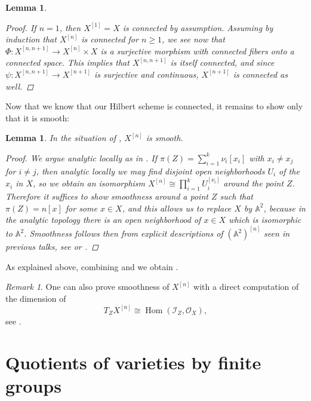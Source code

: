 \documentclass[12pt,a4paper]{amsart}
\theoremstyle{plain}
\newtheorem{lm}[thm]{Lemma}
\theoremstyle{definition}
\theoremstyle{remark}
\newtheorem{rem}[thm]{Remark}
\begin{document}
\begin{lm}
\begin{proof}
    If $n = 1$, then $X^{[1]} = X$ is connected by assumption.
    Assuming by induction that $X^{[n]}$ is connected for $n \geq 1$, we see now that $\Phi \colon X^{[n, n+1]} \to X^{[n]} \times X$ is a surjective morphism with connected fibers onto a connected space.
    This implies that $X^{[n, n+1]}$ is itself connected, and since $\psi \colon X^{[n,n+1]} \to X^{[n+1]}$ is surjective and continuous, $X^{[n+1]}$ is connected as well.
  \end{proof}
\end{lm}

Now that we know that our Hilbert scheme is connected, it remains to show only that it is smooth:

\begin{lm}\label{lm:smoothness}
  In the situation of , $X^{[n]}$ is smooth.

  \begin{proof}
    We argue analytic locally as in .
    If $\pi(Z) = \sum_{i = 1}^{k} \nu_{i} [x_{i}]$ with $x_{i} \neq x_{j}$ for $i \neq j$, then analytic locally we may find disjoint open neighborhoods $U_{i}$ of the $x_{i}$ in $X$, so we obtain an isomorphism $X^{[n]} \cong \prod_{i = 1}^{k} U_{i}^{[\nu_{i}]}$ around the point $Z$.
    Therefore it suffices to show smoothness around a point $Z$ such that $\pi(Z) = n [x]$ for some $x \in X$, and this allows us to replace $X$ by $\mathbb{A}^{2}$, because in the analytic topology there is an open neighborhood of $x \in X$ which is isomorphic to $\mathbb{A}^{2}$.
    Smoothness follows then from explicit descriptions of $(\mathbb{A}^{2})^{[n]}$ seen in previous talks, see \cite[Theorem 1.9]{nak99} or \cite[Theorem 18.7]{ms05}.
  \end{proof}
\end{lm}

As explained above, combining  and  we obtain .

\begin{rem}
  One can also prove smoothness of $X^{[n]}$ with a direct computation of the dimension of
  \[ T_{Z}X^{[n]} \cong \operatorname{Hom}(\mathscr{I}_{Z}, \mathscr{O}_{X}), \]
  see \cite[Example 4.5.10]{hl97}.
\end{rem}

\appendix

\section{Quotients of varieties by finite groups}\label{sec:quotient}
\end{document}
